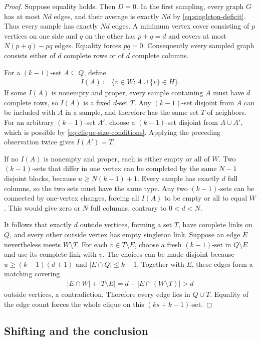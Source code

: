 \begin{proof}
Suppose equality holds. Then $D=0$. In the first sampling, every graph $G$ has at most $Nd$ edges, and their average is exactly $Nd$ by \cref{eq:singleton-deficit}. Thus every sample has exactly $Nd$ edges. A minimum vertex cover consisting of $p$ vertices on one side and $q$ on the other has $p+q=d$ and covers at most $N(p+q)-pq$ edges. Equality forces $pq=0$. Consequently every sampled graph consists either of $d$ complete rows or of $d$ complete columns.

For a $(k-1)$-set $A\subseteq Q$, define
\begin{align*}
I(A)\coloneqq\{v\in W\colon A\cup\{v\}\in H\}.
\end{align*}
If some $I(A)$ is nonempty and proper, every sample containing $A$ must have $d$ complete rows, so $I(A)$ is a fixed $d$-set $T$. Any $(k-1)$-set disjoint from $A$ can be included with $A$ in a sample, and therefore has the same set $T$ of neighbors. For an arbitrary $(k-1)$-set $A'$, choose a $(k-1)$-set disjoint from $A\cup A'$, which is possible by \cref{eq:clique-size-conditions}. Applying the preceding observation twice gives $I(A')=T$.

If no $I(A)$ is nonempty and proper, each is either empty or all of $W$. Two $(k-1)$-sets that differ in one vertex can be completed by the same $N-1$ disjoint blocks, because $u\ge N(k-1)+1$. Every sample has exactly $d$ full columns, so the two sets must have the same type. Any two $(k-1)$-sets can be connected by one-vertex changes, forcing all $I(A)$ to be empty or all to equal $W$. This would give zero or $N$ full columns, contrary to $0<d<N$.

It follows that exactly $d$ outside vertices, forming a set $T$, have complete links on $Q$, and every other outside vertex has empty singleton link. Suppose an edge $E$ nevertheless meets $W\setminus T$. For each $v\in T\setminus E$, choose a fresh $(k-1)$-set in $Q\setminus E$ and use its complete link with $v$. The choices can be made disjoint because $u\ge(k-1)(d+1)$ and $|E\cap Q|\le k-1$. Together with $E$, these edges form a matching covering
\begin{align*}
|E\cap W|+|T\setminus E|=d+|E\cap(W\setminus T)|>d
\end{align*}
outside vertices, a contradiction. Therefore every edge lies in $Q\cup T$. Equality of the edge count forces the whole clique on this $(ks+k-1)$-set.
\end{proof}

\subsection{Shifting and the conclusion}

